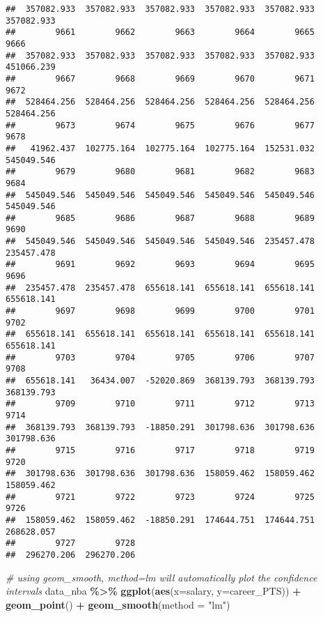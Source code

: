 \documentclass[
]{book}
\newenvironment{Shaded}{\begin{snugshade}}{\end{snugshade}}
\newcommand{\AttributeTok}[1]{\textcolor[rgb]{0.13,0.29,0.53}{#1}}
\newcommand{\CommentTok}[1]{\textcolor[rgb]{0.56,0.35,0.01}{\textit{#1}}}
\newcommand{\FunctionTok}[1]{\textcolor[rgb]{0.13,0.29,0.53}{\textbf{#1}}}
\newcommand{\NormalTok}[1]{#1}
\newcommand{\SpecialCharTok}[1]{\textcolor[rgb]{0.81,0.36,0.00}{\textbf{#1}}}
\newcommand{\StringTok}[1]{\textcolor[rgb]{0.31,0.60,0.02}{#1}}
\begin{document}
\begin{verbatim}
##  357082.933  357082.933  357082.933  357082.933  357082.933  357082.933 
##        9661        9662        9663        9664        9665        9666 
##  357082.933  357082.933  357082.933  357082.933  357082.933  451066.239 
##        9667        9668        9669        9670        9671        9672 
##  528464.256  528464.256  528464.256  528464.256  528464.256  528464.256 
##        9673        9674        9675        9676        9677        9678 
##   41962.437  102775.164  102775.164  102775.164  152531.032  545049.546 
##        9679        9680        9681        9682        9683        9684 
##  545049.546  545049.546  545049.546  545049.546  545049.546  545049.546 
##        9685        9686        9687        9688        9689        9690 
##  545049.546  545049.546  545049.546  545049.546  235457.478  235457.478 
##        9691        9692        9693        9694        9695        9696 
##  235457.478  235457.478  655618.141  655618.141  655618.141  655618.141 
##        9697        9698        9699        9700        9701        9702 
##  655618.141  655618.141  655618.141  655618.141  655618.141  655618.141 
##        9703        9704        9705        9706        9707        9708 
##  655618.141   36434.007  -52020.869  368139.793  368139.793  368139.793 
##        9709        9710        9711        9712        9713        9714 
##  368139.793  368139.793  -18850.291  301798.636  301798.636  301798.636 
##        9715        9716        9717        9718        9719        9720 
##  301798.636  301798.636  301798.636  158059.462  158059.462  158059.462 
##        9721        9722        9723        9724        9725        9726 
##  158059.462  158059.462  -18850.291  174644.751  174644.751  268628.057 
##        9727        9728 
##  296270.206  296270.206
\end{verbatim}

\begin{Shaded}
\begin{Highlighting}[]
\CommentTok{\# using geom\_smooth, method=lm will automatically plot the confidence intervals}
\NormalTok{data\_nba }\SpecialCharTok{\%\textgreater{}\%}
  \FunctionTok{ggplot}\NormalTok{(}\FunctionTok{aes}\NormalTok{(}\AttributeTok{x=}\NormalTok{salary, }\AttributeTok{y=}\NormalTok{career\_PTS)) }\SpecialCharTok{+}
  \FunctionTok{geom\_point}\NormalTok{() }\SpecialCharTok{+}
  \FunctionTok{geom\_smooth}\NormalTok{(}\AttributeTok{method =} \StringTok{"lm"}\NormalTok{)}
\end{Highlighting}
\end{Shaded}
\end{document}
